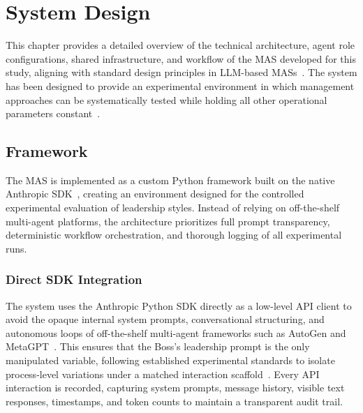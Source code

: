 \chapter{System Design}
\label{chap:system-design}

This chapter provides a detailed overview of the technical architecture, agent role configurations, shared infrastructure, and workflow of the \ac{MAS} developed for this study, aligning with standard design principles in \ac{LLM}-based \acp{MAS}~\cite{guo2024largelanguagemodelbased}.
The system has been designed to provide an experimental environment in which management approaches can be systematically tested while holding all other operational parameters constant~\cite{kwak2026leadershipcoordinationcontrolbehavioral, lin2025simulatingsocialinfluencedynamics}.

\section{Framework}
\label{sec:framework}

The \ac{MAS} is implemented as a custom Python framework built on the native Anthropic \ac{SDK}~\cite{anthropic-sdk-python}, creating an environment designed for the controlled experimental evaluation of leadership styles.
Instead of relying on off-the-shelf multi-agent platforms, the architecture prioritizes full prompt transparency, deterministic workflow orchestration, and thorough logging of all experimental runs.

\subsection{Direct SDK Integration}
\label{subsec:direct-sdk-integration}

The system uses the Anthropic Python \ac{SDK} directly as a low-level \ac{API} client to avoid the opaque internal system prompts, conversational structuring, and autonomous loops of off-the-shelf multi-agent frameworks such as AutoGen and MetaGPT~\cite{wu2023autogenenablingnextgenllm, hong2024metagptmetaprogrammingmultiagent}.
This ensures that the Boss's leadership prompt is the only manipulated variable, following established experimental standards to isolate process-level variations under a matched interaction scaffold~\cite{kwak2026leadershipcoordinationcontrolbehavioral, lin2025simulatingsocialinfluencedynamics}.
Every \ac{API} interaction is recorded, capturing system prompts, message history, visible text responses, timestamps, and token counts to maintain a transparent audit trail.

